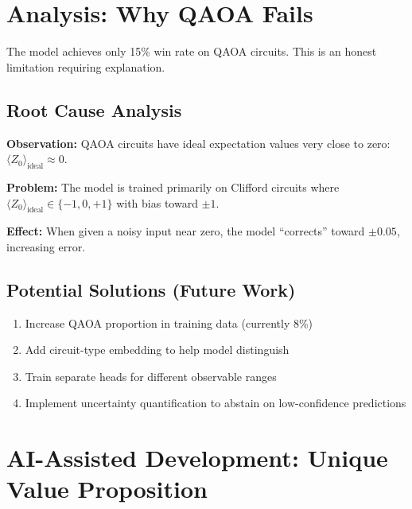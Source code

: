 \documentclass[11pt, a4paper]{article}
\begin{document}
\section{Analysis: Why QAOA Fails}

\begin{limitation}
The model achieves only 15\% win rate on QAOA circuits. This is an honest limitation requiring explanation.
\end{limitation}

\subsection{Root Cause Analysis}

\textbf{Observation:} QAOA circuits have ideal expectation values very close to zero: $\langle Z_0 \rangle_{\text{ideal}} \approx 0$.

\textbf{Problem:} The model is trained primarily on Clifford circuits where $\langle Z_0 \rangle_{\text{ideal}} \in \{-1, 0, +1\}$ with bias toward $\pm 1$.

\textbf{Effect:} When given a noisy input near zero, the model ``corrects'' toward $\pm 0.05$, increasing error.

\subsection{Potential Solutions (Future Work)}

\begin{enumerate}
    \item Increase QAOA proportion in training data (currently 8\%)
    \item Add circuit-type embedding to help model distinguish
    \item Train separate heads for different observable ranges
    \item Implement uncertainty quantification to abstain on low-confidence predictions
\end{enumerate}

\section{AI-Assisted Development: Unique Value Proposition}
\end{document}
